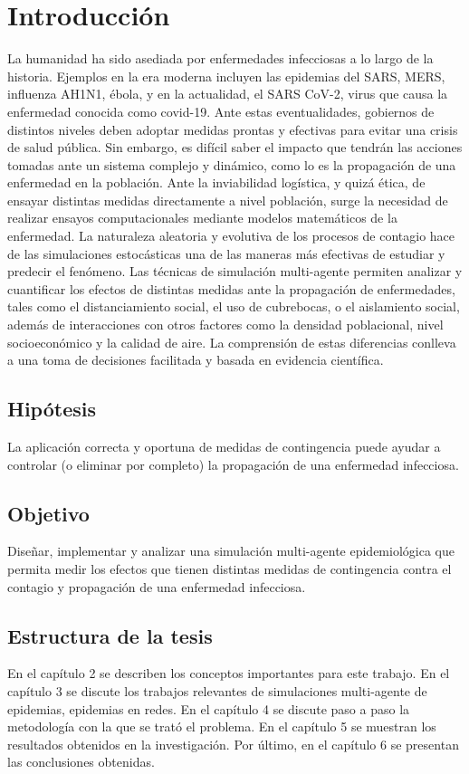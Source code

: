 \chapter{Introducción}

La humanidad ha sido asediada por enfermedades infecciosas a lo largo de la historia. Ejemplos en la era moderna incluyen las epidemias del SARS, MERS, influenza AH1N1, ébola, y en la actualidad, el SARS CoV-2, virus que causa la enfermedad conocida como covid-19. Ante
estas eventualidades, gobiernos de distintos niveles deben adoptar medidas prontas y efectivas para evitar una crisis de salud pública. Sin embargo, es difícil saber el impacto que tendrán las acciones tomadas ante un sistema complejo y dinámico, como lo es la propagación de una enfermedad en la población. Ante la inviabilidad logística, y quizá ética, de ensayar distintas medidas directamente a nivel población, surge la necesidad de realizar ensayos computacionales mediante modelos matemáticos de la enfermedad. La naturaleza aleatoria y evolutiva de los procesos de contagio hace de las simulaciones estocásticas una de las maneras más efectivas de estudiar y predecir el fenómeno.
Las técnicas de simulación multi-agente permiten analizar y cuantificar los efectos de distintas medidas ante la propagación de enfermedades, tales como el distanciamiento social, el uso de cubrebocas, o el aislamiento social, además de interacciones con otros factores como la densidad poblacional, nivel socioeconómico y la calidad de aire. La comprensión de estas diferencias conlleva a una toma de decisiones facilitada y basada en evidencia científica.




\section{Hipótesis}
La aplicación correcta y oportuna de medidas de contingencia puede ayudar a controlar (o eliminar por completo) la propagación de una enfermedad infecciosa. 


\section{Objetivo}
Diseñar, implementar y analizar una simulación multi-agente epidemiológica que permita medir los efectos que tienen distintas medidas de contingencia contra el contagio y propagación de una enfermedad infecciosa.
\section{Estructura de la tesis}
En el capítulo 2 se describen los conceptos importantes para este trabajo. En el capítulo 3 se discute los trabajos relevantes de simulaciones multi-agente de epidemias,  epidemias en redes. En el capítulo 4 se discute paso a paso la metodología con la que se trató el problema. En el capítulo 5 se muestran los resultados obtenidos en la investigación. Por último, en el capítulo 6 se presentan las conclusiones obtenidas.